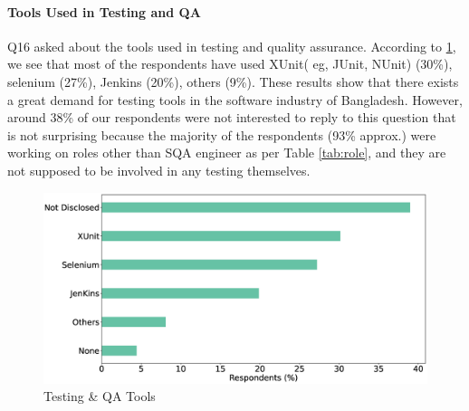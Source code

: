 \paragraph{Tools Used in Testing and QA}
Q16 asked about the tools used in testing and quality assurance. According to \ref{fig:testingTools}, we see that most of the respondents have used XUnit( eg, JUnit, NUnit) (30\%), selenium (27\%), Jenkins (20\%), others (9\%). These results show that there exists a great demand for testing tools in the software industry of Bangladesh. However, around 38\% of our respondents were not interested to reply to this question that is not surprising because the majority of the respondents (93\% approx.) were working on roles other than SQA engineer as per Table \ref{tab:role}, and they are not supposed to be involved in any testing themselves.  

\begin{figure}[h]
\centering
  \includegraphics[scale=0.18]{Figures/Respondents_testing_tools}
  \caption{Testing \& QA Tools}
  \label{fig:testingTools}
\end{figure}



